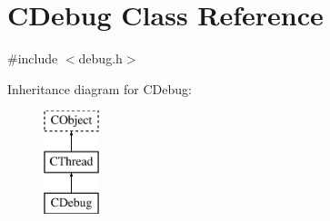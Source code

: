 \hypertarget{class_c_debug}{\section{C\-Debug Class Reference}
\label{class_c_debug}
}


{\ttfamily \#include $<$debug.\-h$>$}

Inheritance diagram for C\-Debug\-:\begin{figure}[H]
\begin{center}
\leavevmode
\includegraphics[height=3.000000cm]{d4/d37/class_c_debug}
\end{center}
\end{figure}
